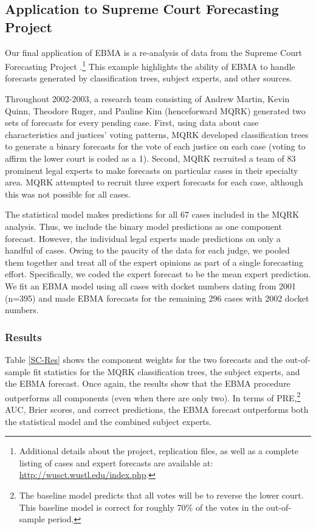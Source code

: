\documentclass[pdftex,12pt,fullpage,oneside]{amsart}
\begin{document}
\subsection{Application to Supreme Court Forecasting Project}

Our final application of EBMA is a re-analysis of data from the
Supreme Court Forecasting Project \citep{Ruger:2004,
  Martin:2004}.\footnote{Additional details about the project,
  replication files, as well as a complete listing of cases and expert
  forecasts are available at: \url{http://wusct.wustl.edu/index.php}.}
This example highlights the ability of EBMA to handle forecasts
generated by classification trees, subject experts, and other sources.

Throughout 2002-2003, a research team consisting of Andrew Martin,
Kevin Quinn, Theodore Ruger, and Pauline Kim (henceforward MQRK)
generated two sets of forecasts for every pending case.  First, using
data about case characteristics and justices' voting patterns, MQRK
developed classification trees to generate a binary forecasts for the
vote of each justice on each case (voting to affirm the lower court is
coded as a 1).  Second, MQRK recruited a team of 83 prominent legal
experts to make forecasts on particular cases in their specialty area.
MQRK attempted to recruit three expert forecasts for each case,
although this was not possible for all cases.

The statistical model makes predictions for all 67 cases included in
the MQRK analysis.  Thus, we include the binary model predictions as
one component forecast. However, the individual legal experts made
predictions on only a handful of cases. Owing to the paucity of the
data for each judge, we pooled them together and treat all of the
expert opinions as part of a single forecasting effort.  Specifically,
we coded the expert forecast to be the mean expert prediction. We fit
an EBMA model using all cases with docket numbers dating from 2001
(n=395) and made EBMA forecasts for the remaining 296 cases with 2002
docket numbers.

 \subsubsection{Results}

 Table \ref{SC-Res} shows the component weights for the two forecasts
 and the out-of-sample fit statistics for the MQRK classification
 trees, the subject experts, and the EBMA forecast. Once again, the
 results show that the EBMA procedure outperforms all components (even
 when there are only two).  In terms of PRE,\footnote{The baseline
   model predicts that all votes will be to reverse the lower court.
   This baseline model is correct for roughly 70\% of the votes in the
   out-of-sample period.} AUC, Brier scores, and correct predictions,
 the EBMA forecast outperforms both the statistical model and the
 combined subject experts.
\end{document}

